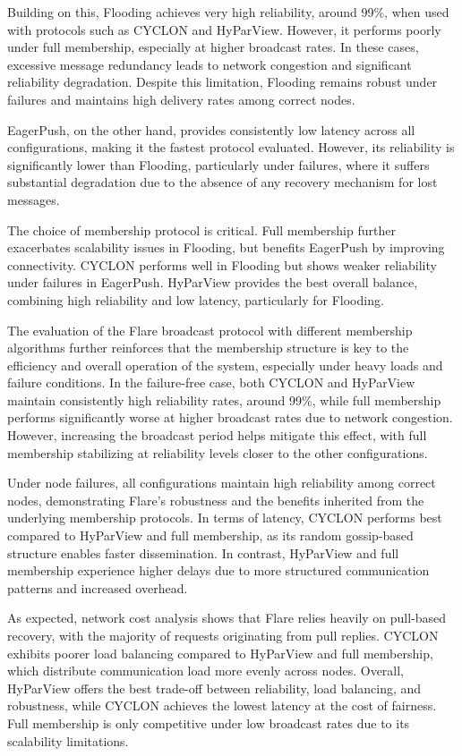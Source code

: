 \documentclass[sigconf,a4paper]{acmart}
\begin{document}
Building on this, Flooding achieves very high reliability, around 99\%, when used with 
protocols such as CYCLON and HyParView. However, it performs poorly under full membership, 
especially at higher broadcast rates. In these cases, excessive message redundancy leads to 
network congestion and significant reliability degradation. Despite this limitation, Flooding 
remains robust under failures and maintains high delivery rates among correct nodes.

EagerPush, on the other hand, provides consistently low latency across all configurations, 
making it the fastest protocol evaluated. However, its reliability is significantly lower 
than Flooding, particularly under failures, where it suffers substantial degradation due to 
the absence of any recovery mechanism for lost messages.

The choice of membership protocol is critical. Full membership further exacerbates scalability 
issues in Flooding, but benefits EagerPush by improving connectivity. CYCLON performs well in 
Flooding but shows weaker reliability under failures in EagerPush. HyParView provides the best 
overall balance, combining high reliability and low latency, particularly for Flooding.

The evaluation of the Flare broadcast protocol with different membership algorithms further 
reinforces that the membership structure is key to the efficiency and overall operation of 
the system, especially under heavy loads and failure conditions. In the failure-free case, 
both CYCLON and HyParView maintain consistently high reliability rates, around 99\%, while 
full membership performs significantly worse at higher broadcast rates due to network congestion. However, increasing the broadcast period helps mitigate this effect, with full membership stabilizing at reliability levels closer to the other configurations.

Under node failures, all configurations maintain high reliability among correct nodes, demonstrating
 Flare's robustness and the benefits inherited from the underlying membership protocols. 
 In terms of latency, CYCLON performs best compared to HyParView and full membership, as 
 its random gossip-based structure enables faster dissemination. In contrast, HyParView and 
 full membership experience higher delays due to more structured communication patterns and 
 increased overhead.

As expected, network cost analysis shows that Flare relies heavily on pull-based recovery, 
with the majority of requests originating from pull replies. CYCLON exhibits poorer load 
balancing compared to HyParView and full membership, which distribute communication 
load more evenly across nodes. Overall, HyParView offers the best trade-off between reliability, 
load balancing, and robustness, while CYCLON achieves the lowest latency at the cost of fairness. 
Full membership is only competitive under low broadcast rates due to its scalability limitations.
\end{document}
